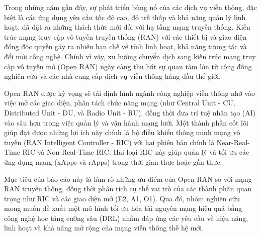 Trong những năm gần đây, sự phát triển bùng nổ của các dịch vụ viễn thông, đặc biệt là các ứng dụng yêu cầu tốc độ cao, độ trễ thấp và khả năng quản lý linh hoạt, đã đặt ra những thách thức mới đối với hạ tầng mạng truyền thống. Kiến trúc mạng truy cập vô tuyến truyền thống (RAN) với các thiết bị và giao diện đóng độc quyền gây ra nhiều hạn chế về tính linh hoạt, khả năng tương tác và đổi mới công nghệ. Chính vì vậy, xu hướng chuyển dịch sang kiến trúc mạng truy cập vô tuyến mở (Open RAN) ngày càng thu hút sự quan tâm lớn từ cộng đồng nghiên cứu và các nhà cung cấp dịch vụ viễn thông hàng đầu thế giới.

Open RAN được kỳ vọng sẽ tái định hình ngành công nghiệp viễn thông nhờ vào việc mở các giao diện, phân tách chức năng mạng (như Central Unit - CU, Distributed Unit - DU, và Radio Unit - RU), đồng thời đưa trí tuệ nhân tạo (AI) vào sâu hơn trong việc quản lý và vận hành mạng lưới. Một thành phần cốt lõi giúp đạt được những lợi ích này chính là bộ điều khiển thông minh mạng vô tuyến (RAN Intelligent Controller - RIC) với hai phiên bản chính là Near-Real-Time RIC và Non-Real-Time RIC. Hai loại RIC này giúp quản lý và tối ưu các ứng dụng mạng (xApps và rApps) trong thời gian thực hoặc gần thực.

Mục tiêu của báo cáo này là làm rõ những ưu điểm của Open RAN so với mạng RAN truyền thống, đồng thời phân tích cụ thể vai trò của các thành phần quan trọng như RIC và các giao diện mở (E2, A1, O1). Qua đó, nhóm nghiên cứu mong muốn đề xuất một mô hình tối ưu hóa tài nguyên mạng hiệu quả bằng công nghệ học tăng cường sâu (DRL) nhằm đáp ứng các yêu cầu về hiệu năng, linh hoạt và khả năng mở rộng của mạng viễn thông thế hệ mới.